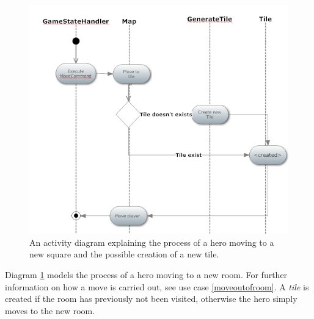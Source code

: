 \begin{figure}[h]
\centering
\begin{center}
\includegraphics{diagrams/moveActivityDiagram.png}
\end{center}
\caption{An activity diagram explaining the process of a hero moving to a new square and the possible creation of a new tile.}
\label{fig:move_activity_diagram}
\end{figure}

Diagram \ref{fig:move_activity_diagram} models the process of a hero moving to a new room. For further information on how a move is carried out, see use case \ref{moveoutofroom}. A \emph{tile} is created if the room has previously not been visited, otherwise the hero simply moves to the new room.



